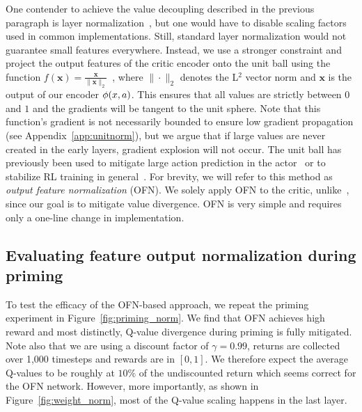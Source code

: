 One contender to achieve the value decoupling described in the previous paragraph is layer normalization~\parencite{ba2016layer}, but one would have to disable scaling factors used in common implementations. Still, standard layer normalization would not guarantee small features everywhere. Instead, we use a stronger constraint and project the output features of the critic encoder onto the unit ball using the function
$f(\mathbf{x}) = \frac{\mathbf{x} }{\|\mathbf{x}\|_2}$~\parencite{zhang2019root}, 
where $\|\cdot\|_2$ denotes the L$^2$ vector norm and $\mathbf{x}$ is the output of our encoder $\phi(x, a)$. This ensures that all values are strictly between $0$ and $1$ and the gradients will be tangent to the unit sphere. Note that this function's gradient is not necessarily bounded to ensure low gradient propagation (see Appendix~\ref{app:unitnorm}), but we argue that if large values are never created in the early layers, gradient explosion will not occur. The unit ball has previously been used to mitigate large action prediction in the actor~\parencite{wang2020striving} or to stabilize RL training in general~\parencite{bjorck2022is}. 
For brevity, we will refer to this method as {\em output feature normalization} (OFN). We solely apply OFN to the critic, unlike~\textcite{wang2020striving}, since our goal is to mitigate value divergence. OFN is very simple and requires only a one-line change in implementation.




\subsection{Evaluating feature output normalization during priming} \label{sec:evalmethod}

To test the efficacy of the OFN-based approach, we repeat the priming experiment in Figure~\ref{fig:priming_norm}.
We find that OFN achieves high reward and most distinctly, Q-value divergence during priming is fully mitigated. 
Note also that we are using a discount factor of $\gamma = 0.99$, returns are collected over 1,000 timesteps and rewards are in $[0, 1]$. 
We therefore expect the average Q-values to be roughly at $10\%$ of the undiscounted return which seems correct for the OFN network. 
However, more importantly, as shown in Figure~\ref{fig:weight_norm}, most of the Q-value scaling happens in the last layer.

